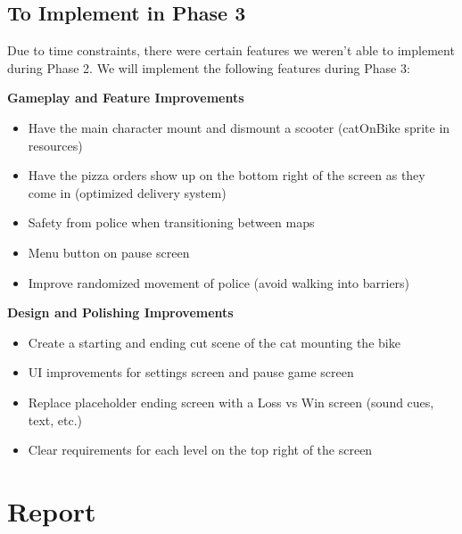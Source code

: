 \documentclass[12pt]{article}
\begin{document}
\bigskip

\subsection{To Implement in Phase 3}
\hspace{0.52cm}
Due to time constraints, there were certain features we weren't able to implement during Phase 2. We will implement the following features during Phase 3:
\medskip

\begin{minipage}[t]{0.8\textwidth}
\textbf{Gameplay and Feature Improvements}
\begin{itemize}[itemsep=-1pt, topsep=5pt]
	\item Have the main character mount and dismount a scooter (catOnBike sprite in resources)
    \item Have the pizza orders show up on the bottom right of the screen as they come in (optimized delivery system)
    \item Safety from police when transitioning between maps
    \item Menu button on pause screen
    \item Improve randomized movement of police (avoid walking into barriers)
\end{itemize}
\end{minipage}

\bigskip
\begin{minipage}[t]{0.8\textwidth}
\textbf{Design and Polishing Improvements}
\begin{itemize}[itemsep=-1pt, topsep=5pt]
    \item Create a starting and ending cut scene of the cat mounting the bike
    \item UI improvements for settings screen and pause game screen
    \item Replace placeholder ending screen with a Loss vs Win screen (sound cues, text, etc.)
    \item Clear requirements for each level on the top right of the screen
\end{itemize}
\end{minipage} 


\section{Report}
\end{document}
